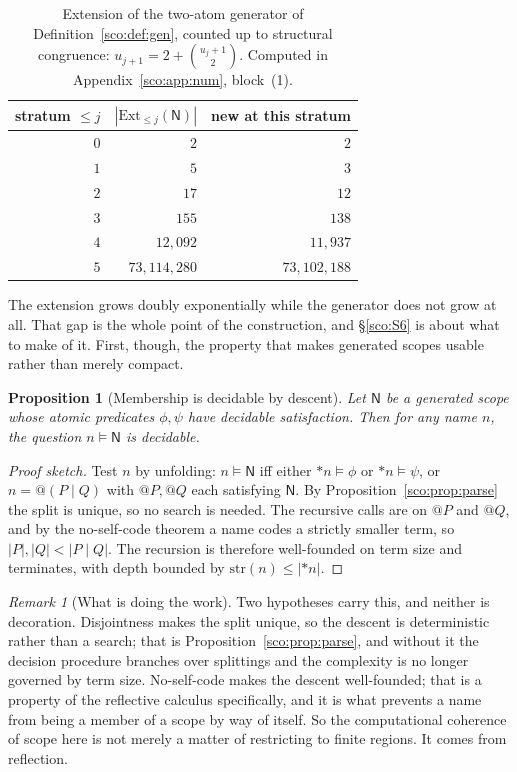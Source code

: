 \documentclass[11pt]{article}
\makeatletter
\theoremstyle{plain}
\newtheorem{proposition}[theorem]{Proposition}
\theoremstyle{definition}
\theoremstyle{remark}
\newtheorem{remark}[theorem]{Remark}
\newcommand{\Nsp}{\mathsf{N}}
\newcommand{\quo}[1]{@#1}
\newcommand{\drop}[1]{*#1}
\newcommand{\Ext}{\mathrm{Ext}}
\newcommand{\str}{\mathrm{str}}
\makeatother
\begin{document}
\begin{table}[t]
\centering
\begin{tabular}{rrr}
\toprule
stratum $\le j$ & $|\Ext_{\le j}(\Nsp)|$ & new at this stratum \\
\midrule
$0$ & $2$      & $2$ \\
$1$ & $5$      & $3$ \\
$2$ & $17$     & $12$ \\
$3$ & $155$    & $138$ \\
$4$ & $12{,}092$ & $11{,}937$ \\
$5$ & $73{,}114{,}280$ & $73{,}102{,}188$ \\
\bottomrule
\end{tabular}
\caption{Extension of the two-atom generator of
Definition~\ref{sco:def:gen}, counted up to structural congruence:
$u_{j+1} = 2 + \binom{u_j+1}{2}$. Computed in
Appendix~\ref{sco:app:num}, block~(1).}
\label{sco:tab:growth}
\end{table}

The extension grows doubly exponentially while the generator does not
grow at all. That gap is the whole point of the construction, and
\S\ref{sco:S6} is about what to make of it. First, though, the property
that makes generated scopes usable rather than merely compact.

\begin{proposition}[Membership is decidable by descent]\label{sco:prop:descent}
Let $\Nsp$ be a generated scope whose atomic predicates $\phi, \psi$ have
decidable satisfaction. Then for any name $n$, the question
$n \models \Nsp$ is decidable.
\end{proposition}

\begin{proof}[Proof sketch]
Test $n$ by unfolding: $n \models \Nsp$ iff either $\drop{n} \models \phi$
or $\drop{n} \models \psi$, or $n = \quo{(P \mid Q)}$ with $\quo{P},
\quo{Q}$ each satisfying $\Nsp$. By
Proposition~\ref{sco:prop:parse} the split is unique, so no search is
needed. The recursive calls are on $\quo{P}$ and $\quo{Q}$, and by the
no-self-code theorem a name codes a strictly smaller term, so
$|P|, |Q| < |P \mid Q|$. The recursion is therefore well-founded on term
size and terminates, with depth bounded by $\str(n) \le |\drop{n}|$.
\end{proof}

\begin{remark}[What is doing the work]\label{sco:rem:whatworks}
Two hypotheses carry this, and neither is decoration. Disjointness makes
the split unique, so the descent is deterministic rather than a search;
that is Proposition~\ref{sco:prop:parse}, and without it the decision
procedure branches over splittings and the complexity is no longer
governed by term size. No-self-code makes the descent well-founded; that
is a property of the reflective calculus specifically, and it is what
prevents a name from being a member of a scope by way of itself. So the
computational coherence of scope here is not merely a matter of
restricting to finite regions. It comes from reflection.
\end{remark}
\end{document}
